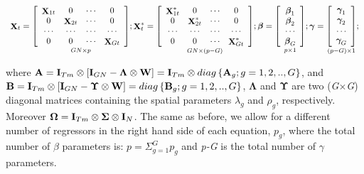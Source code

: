 \documentclass[article]{jss}
\begin{document}
\begin{equation}
\begin{array}{l}
 \mathop{{\bf X}}\nolimits_{t} =\mathop{\left[\begin{array}{cccc} {\mathop{{\bf X}}\nolimits_{1t} } & {0} & {\cdots } & {0} \\ {0} & {\mathop{{\bf X}}\nolimits_{2t} } & {\cdots } & {0} \\ {\cdots } & {\cdots } & {\cdots } & {\cdots } \\ {0} & {0} & {\cdots } & {\mathop{{\bf X}}\nolimits_{Gt} } \end{array}\right]}\limits_{GN\times p} ;


 \mathop{{\bf X}}^*_{t} =\mathop{\left[\begin{array}{cccc} \mathop{{\bf X}}^*_{1t} & {0} & {\cdots } & {0} \\ {0} & \mathop{{\bf X}}^*_{2t} & {\cdots } & {0} \\ {\cdots } & {\cdots } & {\cdots } & {\cdots } \\ {0} & {0} & {\cdots } & \mathop{{\bf X}}^*_{Gt} \end{array}\right]}\limits_{GN\times (p-G)};

{\boldsymbol \beta} =\mathop{\left[\begin{array}{c} {\mathop{{\boldsymbol \beta}}\nolimits_{1} } \\ {\mathop{{\boldsymbol \beta}}\nolimits_{2} } \\ {\cdots } \\ {\mathop{{\boldsymbol \beta}}\nolimits_{G} } \end{array}\right]}\limits_{p\times 1} ;

{\boldsymbol \gamma} =\mathop{\left[\begin{array}{c} {\mathop{{\boldsymbol \gamma}}\nolimits_{1} } \\ {\mathop{{\boldsymbol \gamma}}\nolimits_{2} } \\ {\cdots } \\ {\mathop{{\boldsymbol \gamma}}\nolimits_{G} } \end{array}\right]}\limits_{(p-G)\times 1} ;
 \end{array}
  \label{eq:sac}
 \end{equation}

where \({\bf A}={\bf I}_{Tm} \otimes \left[{\bf I}_{GN} -{\boldsymbol \Lambda} \otimes {\bf W}\right] = {\bf I}_{Tm} \otimes diag\left\{{\bf A}_{g}; g=1,2,..,G\right\}\), and \({\bf B}={\bf I}_{Tm} \otimes \left[{\bf I}_{GN} -{\boldsymbol \Upsilon } \otimes {\bf W}\right]=diag \left\{{\bf B}_{g} ;g=1,2,..,G\right\}\), \({\boldsymbol \Lambda}\) and \({\boldsymbol \Upsilon}\) are two (\emph{G}\(\times\)\emph{G}) diagonal matrices containing the spatial parameters \({\lambda}_{g}\) and \({\rho}_{g}\), respectively.
Moreover \({\boldsymbol \Omega} ={\bf I}_{Tm} \otimes {\boldsymbol \Sigma} \otimes {\bf I}_{N}\). The same as before, we allow for a different number of regressors in the right hand side of each equation, \(p_{g}\), where the total number of \(\beta\) parameters is: \(p=\Sigma_{g=1}^{G} p_{g}\) and \emph{p-G} is the total number of \(\gamma\) parameters.
\end{document}
